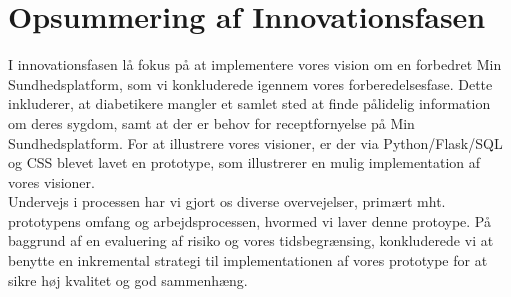 \section{Opsummering af Innovationsfasen}
I innovationsfasen lå fokus på at implementere vores vision om en forbedret Min Sundhedsplatform, som vi konkluderede igennem vores forberedelsesfase. Dette inkluderer, at diabetikere mangler et samlet sted at finde pålidelig information om deres sygdom, samt at der er behov for receptfornyelse på Min Sundhedsplatform. For at illustrere vores visioner, er der via Python/Flask/SQL og CSS blevet lavet en prototype, som illustrerer en mulig implementation af vores visioner.\\
Undervejs i processen har vi gjort os diverse overvejelser, primært mht. prototypens omfang og arbejdsprocessen, hvormed vi laver denne protoype. På baggrund af en evaluering af risiko og vores tidsbegrænsing, konkluderede vi at benytte en inkremental strategi til implementationen af vores prototype for at sikre høj kvalitet og god sammenhæng. 
